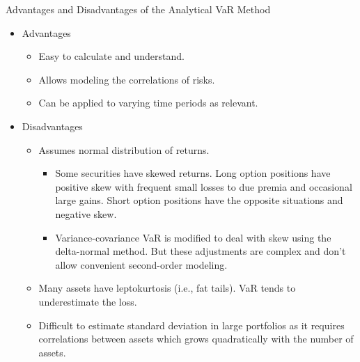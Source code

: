 \documentclass[../custom]{flashcards}
\newcommand{\studyArea}{Risk Management}
\begin{document}
\begin{flashcard}[\studyArea]{Advantages and Disadvantages of the Analytical VaR Method}
    \begin{itemize}
        \item Advantages
        \begin{itemize}
            \item Easy to calculate and understand.
            \item Allows modeling the correlations of risks.
            \item Can be applied to varying time periods as relevant.
        \end{itemize}
        \item Disadvantages
        \begin{itemize}
            \item Assumes normal distribution of returns.
                \begin{itemize}
                    \item Some securities have skewed returns. Long option positions have positive skew with frequent small losses to due premia and occasional large gains. Short option positions have the opposite situations and negative skew.
                    \item Variance-covariance VaR is modified to deal with skew using the delta-normal method. But these adjustments are complex and don't allow convenient second-order modeling.
                \end{itemize}
            \item Many assets have leptokurtosis (i.e., fat tails). VaR tends to underestimate the loss.
            \item Difficult to estimate standard deviation in large portfolios as it requires correlations between assets which grows quadratically with the number of assets.
        \end{itemize}
    \end{itemize}
\end{flashcard}
\end{document}
